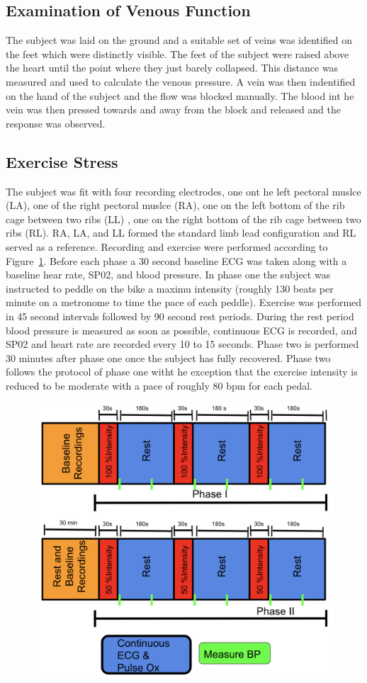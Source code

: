\documentclass[12pt]{article}
\begin{document}
\subsection{Examination of Venous Function}
The subject was laid on the ground and a suitable set of veins was identified on the feet which were distinctly visible. The feet of the subject were raised above the heart until the point where they just barely collapsed. This distance was measured and used to calculate the venous pressure. A vein was then indentified on the hand of the subject and the flow was blocked manually.  The blood int he vein was then pressed towards and away from the block and released and the response was observed.

\subsection{Exercise Stress}
The subject was fit with four recording electrodes, one ont he left pectoral muslce (LA), one of the right pectoral muslce (RA), one on the left bottom of the rib cage between two ribs (LL) , one on the right bottom of the rib cage between two ribs (RL). RA, LA, and LL formed the standard limb lead configuration and RL served as a reference. Recording and exercise were performed according to Figure~\ref{fig:Protocol}. Before each phase a 30 second baseline ECG was taken along with a baseline hear rate, SP02, and blood pressure. In phase one the subject was instructed to peddle on the bike a maximu intensity (roughly 130 beats per minute on a metronome to time the pace of each peddle). Exercise was performed in 45 second intervals followed by 90 second rest periods. During the rest period blood pressure is measured as soon as possible, continuous ECG is recorded, and SP02 and heart rate are recorded every 10 to 15 seconds. Phase two is performed 30 minutes after phase one once the subject has fully recovered. Phase two follows the protocol of phase one witht he exception that the exercise intensity is reduced to be moderate with a pace of roughly 80 bpm for each pedal.

\begin{figure}[H]
	
	\centering
	\includegraphics[width = .8\textwidth]{Figures/protocol.png}
	\caption{}
	\label{fig:Protocol}
\end{figure}
\end{document}
